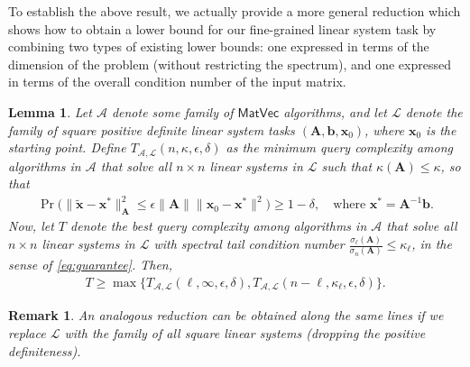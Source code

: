 \documentclass[11pt]{article}
\def\x{{\mathbf x}}
\def\MatVec{{\mathsf{MatVec}}}
\def\b{{\mathbf b}}
\def\A{{\mathbf A}}
\def\Ac{{\mathcal A}}
\def\Lc{{\mathcal L}}
\newtheorem{lem}[thm]{Lemma}
\newtheorem{remark}[thm]{Remark}
\begin{document}
To establish the above result, we actually provide a more general reduction which shows how to obtain a lower bound for our fine-grained linear system task by combining two types of existing lower bounds: one expressed in terms of the dimension of the problem (without restricting the spectrum), and one expressed in terms of the overall condition number of the input matrix.
\begin{lem}\label{l:lower}
  Let $\Ac$ denote some family of $\MatVec$ algorithms, and let $\Lc$ denote the family of square positive definite linear system tasks $(\A,\b,\x_0)$, where $\x_0$ is the starting point. Define $T_{\Ac,\Lc}(n,\kappa,\epsilon,\delta)$ as the minimum query complexity among algorithms in $\Ac$ that solve all $n\times n$ linear systems in $\Lc$ such that $\kappa(\A)\leq \kappa$, so that
    \begin{align}
    \Pr\Big(\|\tilde\x-\x^*\|_{\A}^2\leq\epsilon\|\A\|\|\x_0-\x^*\|^2\Big)\geq 1-\delta,\quad \text{where }\x^*=\A^{-1}\b.\label{eq:guarantee}
    \end{align}
    Now, let $T$ denote the best query complexity among algorithms in $\Ac$ that solve all $n\times n$ linear systems in $\Lc$ with spectral tail condition number $\frac{\sigma_{\ell}(\A)}{\sigma_n(\A)}\leq \kappa_\ell$, in the sense of \eqref{eq:guarantee}. Then, 
    \begin{align*}
        T\ge \max\Big\{T_{\Ac,\Lc}(\ell,\infty,\epsilon,\delta),T_{\Ac,\Lc}(n-\ell,\kappa_\ell,\epsilon,\delta)\Big\}.
    \end{align*}
  \end{lem}
  \begin{remark}
    An analogous reduction can be obtained along the same lines if we replace $\Lc$ with the family of all square linear systems (dropping the positive definiteness).
  \end{remark}
\end{document}
